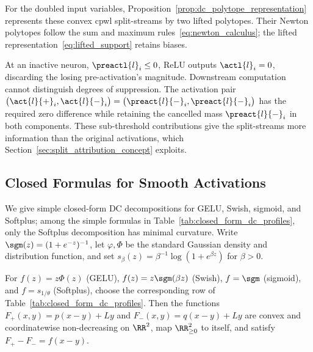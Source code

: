 For the doubled input variables, Proposition~\ref{prop:dc_polytope_representation} represents these convex \ac{cpwl} split-streams by two lifted polytopes. Their Newton polytopes follow the sum and maximum rules~\eqref{eq:newton_calculus}; the lifted representation~\eqref{eq:lifted_support} retains biases.

\begin{remark}\label{rem:subthreshold}
At an inactive neuron, $\preactl{l}_i\le0$, ReLU outputs $\actl{l}_i=0$, discarding the losing pre-activation's magnitude. Downstream computation cannot distinguish degrees of suppression. The activation pair $\bigl(\act{l}{+}_i,\act{l}{-}_i\bigr)=\bigl(\preact{l}{-}_i,\preact{l}{-}_i\bigr)$ has the required zero difference while retaining the cancelled mass $\preact{l}{-}_i$ in both components. These sub-threshold contributions give the split-streams more information than the original activations, which Section~\ref{sec:split_attribution_concept} exploits.
\end{remark}

\subsection{Closed Formulas for Smooth Activations}\label{sec:closed_form_dc_activations}

We give simple closed-form DC decompositions for GELU, Swish, sigmoid, and Softplus; among the simple formulas in Table~\ref{tab:closed_form_dc_profiles}, only the Softplus decomposition has minimal curvature. Write $\sgm(z)=(1+e^{-z})^{-1}$, let $\varphi,\Phi$ be the standard Gaussian density and distribution function, and set $s_\beta(z)=\beta^{-1}\log(1+e^{\beta z})$ for $\beta>0$.

\begin{corollary}\label{cor:closed_form_dc_activations}
For $f(z)=z\Phi(z)$ (GELU), $f(z)=z\sgm(\beta z)$ (Swish), $f=\sgm$ (sigmoid), and $f=s_{1/\theta}$ (Softplus), choose the corresponding row of Table~\ref{tab:closed_form_dc_profiles}. Then the functions $F_+(x,y)=p(x-y)+Ly$ and $F_-(x,y)=q(x-y)+Ly$ are convex and coordinatewise non-decreasing on $\RR^2$, map $\RR^2_{\ge0}$ to itself, and satisfy $F_+-F_-=f(x-y)$.
\end{corollary}

